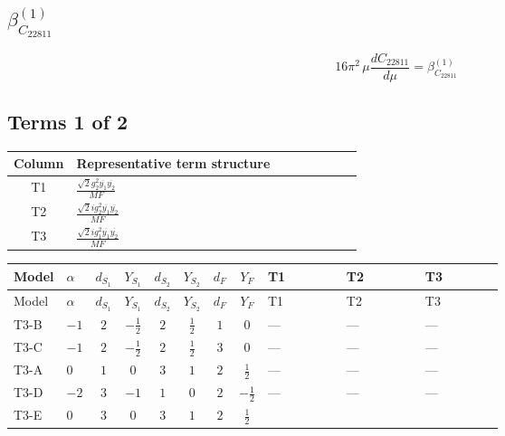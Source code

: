 \documentclass[8pt]{article}
\begin{document}
\begin{landscape}
\section*{$\beta_{C_{22811}}^{(1)}$}
\[16\pi^2\,\mu\frac{d C_{22811}}{d\mu}=\beta_{C_{22811}}^{(1)}\]
\subsection*{Terms 1 of 2}
\begin{center}
\begin{tabular}{@{}c >{\raggedright\arraybackslash}p{0.82\linewidth}@{}}
\toprule
Column & Representative term structure \\
\midrule
T1 & \(\displaystyle \frac{\sqrt{2} g_{2}^{2} \overline{y_{1}} \overline{y_{2}}}{MF}\) \\
\midrule
T2 & \(\displaystyle \frac{\sqrt{2} i g_{2}^{2} \overline{y_{1}} \overline{y_{2}}}{MF}\) \\
\midrule
T3 & \(\displaystyle \frac{\sqrt{2} i g_{1}^{2} \overline{y_{1}} \overline{y_{2}}}{MF}\) \\
\midrule
\bottomrule
\end{tabular}
\end{center}
\smallskip
\tiny
\begin{longtable}{@{}llcccccc >{\raggedright\arraybackslash}p{0.21\linewidth} >{\raggedright\arraybackslash}p{0.21\linewidth} >{\raggedright\arraybackslash}p{0.21\linewidth}@{}}
\toprule
Model & $\alpha$ & $d_{S_1}$ & $Y_{S_1}$ & $d_{S_2}$ & $Y_{S_2}$ & $d_F$ & $Y_F$ & T1 & T2 & T3 \\
\midrule
\endfirsthead
\toprule
Model & $\alpha$ & $d_{S_1}$ & $Y_{S_1}$ & $d_{S_2}$ & $Y_{S_2}$ & $d_F$ & $Y_F$ & T1 & T2 & T3 \\
\midrule
\endhead
T3-B & $-1$ & $2$ & $-\frac{1}{2}$ & $2$ & $\frac{1}{2}$ & $1$ & $0$ & --- & --- & --- \\
\midrule
T3-C & $-1$ & $2$ & $-\frac{1}{2}$ & $2$ & $\frac{1}{2}$ & $3$ & $0$ & --- & --- & --- \\
\midrule
T3-A & $0$ & $1$ & $0$ & $3$ & $1$ & $2$ & $\frac{1}{2}$ & --- & --- & --- \\
\midrule
T3-D & $-2$ & $3$ & $-1$ & $1$ & $0$ & $2$ & $-\frac{1}{2}$ & --- & --- & --- \\
\midrule
T3-E & $0$ & $3$ & $0$ & $3$ & $1$ & $2$ & $\frac{1}{2}$ & \scriptsize\adjustbox{max width=\linewidth}{$\begin{gathered} - \frac{\sqrt{2} g_{2}^{2} \overline{y_{1}} \overline{y_{2}}}{4 MF}\end{gathered}$} & \scriptsize\adjustbox{max width=\linewidth}{$\begin{gathered} - \frac{33 \sqrt{2} i g_{2}^{2} \overline{y_{1}} \overline{y_{2}}}{16 MF}\end{gathered}$} & \scriptsize\adjustbox{max width=\linewidth}{$\begin{gathered} - \frac{3 \sqrt{2} i g_{1}^{2} \overline{y_{1}} \overline{y_{2}}}{16 MF}\end{gathered}$} \\
\midrule
\bottomrule
\end{longtable}
\clearpage

\end{landscape}
\end{document}
